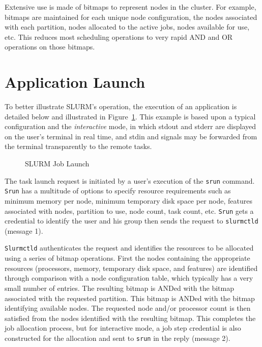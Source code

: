 \documentclass[10pt,onecolumn,times]{../common/llncs}
\begin{document}
{Extensive use is made of bitmaps to represent nodes in the cluster. 
For example, bitmaps are maintained for each unique node configuration, 
the nodes associated with each partition, nodes allocated to 
the active jobs, nodes available for use, etc. This reduces most 
scheduling operations to very rapid AND and OR operations on those bitmaps.

\section{Application Launch}

To better illustrate SLURM's operation, the execution of an 
application is detailed below and illustrated in Figure~\ref{launch}.
This example is based upon a typical configuration and the 
{\em interactive} mode, in which stdout and
stderr are displayed on the user's terminal in real time, and stdin and
signals may be forwarded from the terminal transparently to the remote
tasks.

\begin{figure}[tb]
\centerline{}
\caption{\small SLURM Job Launch}
\label{launch}
\end{figure}

The task launch request is initiated by a user's execution of the 
{\tt srun} command. {\tt Srun} has a multitude of options to specify 
resource requirements such as minimum memory per node, minimum 
temporary disk space per node, features associated with nodes, 
partition to use, node count, task count, etc.
{\tt Srun} gets a credential to identify the user and his group 
then sends the request to {\tt slurmctld} (message 1). 

{\tt Slurmctld} authenticates the request and identifies the resources 
to be allocated using a series of bitmap operations.
First the nodes containing the appropriate resources (processors, 
memory, temporary disk space, and features) are identified through 
comparison with a node configuration table, which typically has 
a very small number of entries. 
The resulting bitmap is ANDed with the bitmap associated with the 
requested partition. 
This bitmap is ANDed with the bitmap identifying available nodes. 
The requested node and/or processor count is then satisfied from 
the nodes identified with the resulting bitmap.
This completes the job allocation process, but for interactive 
mode, a job step credential is also constructed for the allocation 
and sent to {\tt srun} in the reply (message 2).

}
\end{document}
